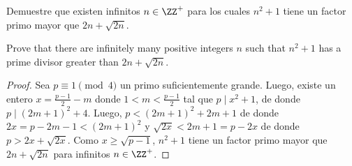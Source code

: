 \begin{probEG}
	Demuestre que existen infinitos $n\in\ZZ^+$ para los cuales $n^2+1$ tiene un factor primo mayor que $2n+\sqrt{2n}$.
	\begin{hint}
		Prove that there are infinitely many positive integers $n$ such that $n^2+1$ has a prime divisor greater than $2n+\sqrt{2n}$.
	\end{hint}
\end{probEG}

\begin{proof}
	Sea $p\equiv 1\pmod 4$ un primo suficientemente grande. Luego, existe un entero $x=\frac{p-1}{2}-m$ donde $1<m<\frac{p-1}{2}$ tal que $p\mid x^2+1$, de donde $p\mid(2m+1)^2+4$. Luego, $p<(2m+1)^2+2m+1$ de donde $2x=p-2m-1<(2m+1)^2$ y $\sqrt{2x}<2m+1=p-2x$ de donde $p>2x+\sqrt{2x}$. Como $x\ge\sqrt{p-1}$, $n^2+1$ tiene un factor primo mayor que $2n+\sqrt{2n}$ para infinitos $n\in\ZZ^+$.
\end{proof}
